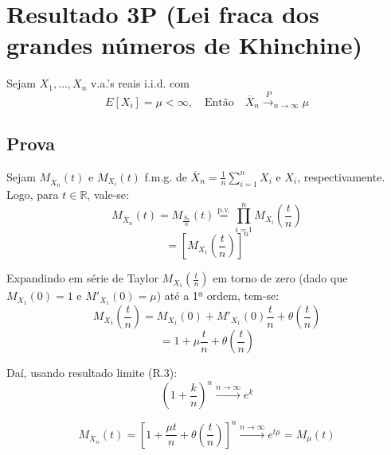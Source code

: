 \section*{Resultado 3P (Lei fraca dos grandes números de Khinchine)}

Sejam $X_1, \ldots, X_n$ v.a.'s reais i.i.d. com
\begin{equation}
    E[X_i] = \mu < \infty, \quad \text{Então} \quad \overline{X}_n \xrightarrow{P}_{n \to \infty} \mu
\end{equation}

\subsection*{Prova}
Sejam $M_{\overline{X}_n}(t)$ e $M_{X_i}(t)$ f.m.g. de $\overline{X}_n = \frac{1}{n} \sum_{i=1}^n X_i$ e $X_i$, respectivamente. Logo, para $t \in \mathbb{R}$, vale-se:
\begin{equation}
    M_{\overline{X}_n}(t) = M_{\frac{S_n}{n}}(t) \overset{\text{p.v.}}{=} \prod_{i=1}^n M_{X_i}\left(\frac{t}{n}\right)
\end{equation}
\begin{equation}
    = \left[ M_{X_1}\left(\frac{t}{n}\right) \right]^n \tag{3P.1}
\end{equation}

Expandindo em série de Taylor $M_{X_1}\left(\frac{t}{n}\right)$ em torno de zero (dado que $M_{X_1}(0) = 1$ e $M'_{X_1}(0) = \mu$) até a 1ª ordem, tem-se:
\begin{equation}
    M_{X_1}\left(\frac{t}{n}\right) = M_{X_1}(0) + M'_{X_1}(0) \frac{t}{n} + \theta\left(\frac{t}{n}\right)
\end{equation}
\begin{equation}
    = 1 + \mu \frac{t}{n} + \theta\left(\frac{t}{n}\right)
\end{equation}

Daí, usando resultado limite (R.3):
\begin{equation}
    \left(1 + \frac{k}{n}\right)^n \xrightarrow{n \to \infty} e^k
\end{equation}

\begin{equation}
    M_{\overline{X}_n}(t) = \left[ 1 + \frac{\mu t}{n} + \theta\left(\frac{t}{n}\right) \right]^n \xrightarrow{n \to \infty} e^{t\mu} = M_{\mu}(t)
\end{equation}